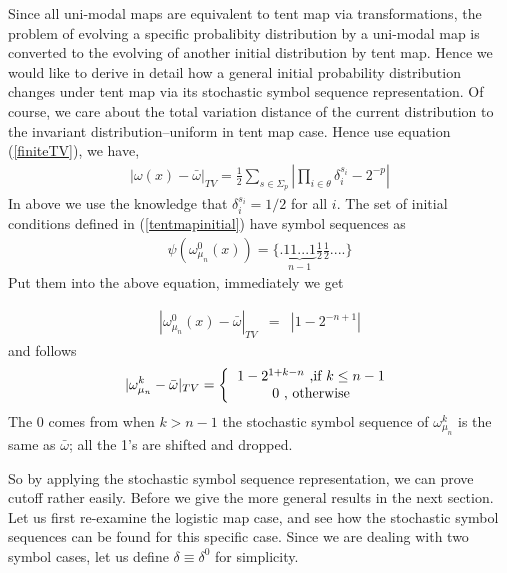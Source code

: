 \documentclass{article}
\begin{document}
Since all uni-modal maps are equivalent to tent map via transformations, the problem of evolving a specific probalibity distribution by a uni-modal map is converted to the evolving of another initial distribution by tent map. Hence we would like to derive in detail how a general initial probability distribution changes under tent map via its stochastic symbol sequence representation. Of course, we care about the total variation distance of the current distribution to the invariant distribution--uniform in tent map case. Hence use equation (\ref{finiteTV}), we have,
   \begin{eqnarray}
  \label{uniformTV}
|\omega(x)-\bar{\omega}|_{TV} = \frac{1}{2} \sum_{s\in\Sigma_p} \left| \prod_{i\in \theta}\delta_i^{s_i}-2^{-p}  \right| 
 \end{eqnarray}
In above we use the knowledge that $\delta_i^{s_i}=1/2$ for all $i$. 
The set of initial conditions defined in (\ref{tentmapinitial}) have symbol sequences as
\begin{eqnarray}
 \psi(\omega_{\mu_n}^0(x)) =  \{.\underbrace{11...1}_{n-1}\frac{1}{2}\frac{1}{2}....\}
 \end{eqnarray}
Put them into the above equation, immediately we get

   \begin{eqnarray}
  \label{uniformICTV}
   |\omega_{\mu_n}^0(x)-\bar{\omega}|_{TV} &= & \left| 1-2^{-n+1}   \right| 
 \end{eqnarray}
and follows
  \begin{eqnarray}
  \label{nunkTV}
   |\omega_{\mu_n}^k-\bar{\omega} |_{TV} =   \left\{ \begin{tabular}{c} 
                                              $1- 2^{1+k-n} $  ,if $k \le n-1$ \\
                                              $0$   , otherwise
                                             \end{tabular}\right.
  \end{eqnarray}
The $0$ comes from when $k>n-1$ the stochastic symbol sequence of $\omega_{\mu_n}^k$ is the same as $\bar{\omega}$; all the 1's are shifted and dropped. 

So by applying the stochastic symbol sequence representation, we can prove cutoff rather easily. Before we give the more general results in the next section. Let us first re-examine the logistic map case, and see how the stochastic symbol sequences can be found for this specific case. Since we are dealing with two symbol cases, let us define $\delta \equiv \delta^0$ for simplicity.
\end{document}
